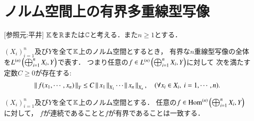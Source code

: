 \section{ノルム空間上の有界多重線型写像}
	[参照元:平井\cite{key7}]
	$\K$を$\R$または$\C$と考える．また$n \geq 1$とする．
	\begin{screen}
		\begin{dfn}[有界な多重線型写像]
			$(X_i)_{i=1}^n$及び$Y$を全て$\K$上のノルム空間とするとき，
			有界な$n$重線型写像の全体を$\ContLn{\bigoplus_{i=1}^n X_i}{Y}{n}$で表す．
			つまり任意の$f \in \ContLn{\bigoplus_{i=1}^n X_i}{Y}{n}$に対して
			次を満たす定数$C \geq 0$が存在する:
			\begin{align}
				\Norm{f(x_1,\cdots,x_n)}{Y} \leq C \Norm{x_1}{X_1}\cdots\Norm{x_n}{X_n},
				\quad (\forall x_i \in X_i,\ i=1,\cdots,n).
				\label{eq:def_bounced_multilinear_mapping}
			\end{align}
		\end{dfn}
	\end{screen}
	
	\begin{screen}
		\begin{thm}[有界$\Leftrightarrow$連続]
			$(X_i)_{i=1}^n$及び$Y$を全て$\K$上のノルム空間とする．
			任意の$f \in \Ln{\bigoplus_{i=1}^n X_i}{Y}{n}$に対して，
			$f$が連続であることと$f$が有界であることは一致する．
		\end{thm}
	\end{screen}
	
